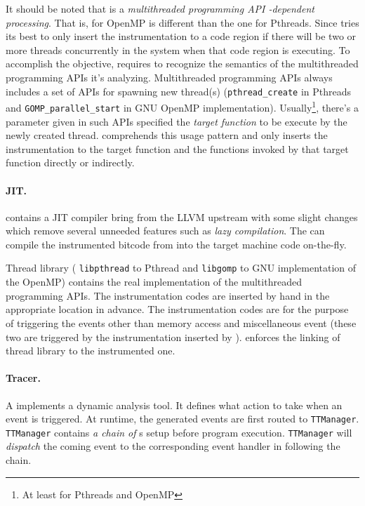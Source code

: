 It should be noted that \Rewriter{} is a \textit{multithreaded programming API -dependent processing}. That is, \Rewriter{} for OpenMP is different than the one for Pthreads. Since \Rewriter{} tries its best to only insert the instrumentation to a code region if there will be two or more threads concurrently in the system when that code region is executing. To accomplish the objective, \Rewriter{} requires to recognize the semantics of the multithreaded programming APIs it's analyzing. Multithreaded programming APIs always includes a set of APIs for spawning new thread(s) (\ie \verb|pthread_create| in Pthreads and \verb|GOMP_parallel_start| in GNU OpenMP implementation). Usually\footnote{At least for Pthreads and OpenMP}, there's a parameter given in such APIs specified the \textit{target function} to be execute by the newly created thread. \Rewriter{} comprehends this usage pattern and only inserts the instrumentation to the target function and the functions invoked by that target function directly or indirectly.

\paragraph{JIT.}
\ThreadTracer{} contains a JIT compiler bring from the LLVM upstream with some slight changes which remove several unneeded features such as \textit{lazy compilation}. The \JIT{} can compile the instrumented bitcode from \Rewriter{} into the target machine code on-the-fly. 

Thread library (\eg{} \verb|libpthread| to Pthread and \verb|libgomp| to GNU implementation of the OpenMP) contains the real implementation of the multithreaded programming APIs. The instrumentation codes are inserted by hand in the appropriate location in advance. The instrumentation codes are for the purpose of triggering the events other than memory access and miscellaneous event (these two are triggered by the instrumentation inserted by \Rewriter{}). \JIT{} enforces the linking of thread library to the instrumented one.

\paragraph{Tracer.}
A \Tracer{} implements a dynamic analysis tool. It defines what action to take when an event is triggered. At runtime, the generated events are first routed to \verb|TTManager|. \verb|TTManager| contains \textit{a chain of} \Tracer{}s setup before program execution. \verb|TTManager| will \textit{dispatch} the coming event to the corresponding event handler in \Tracer{} following the chain.

